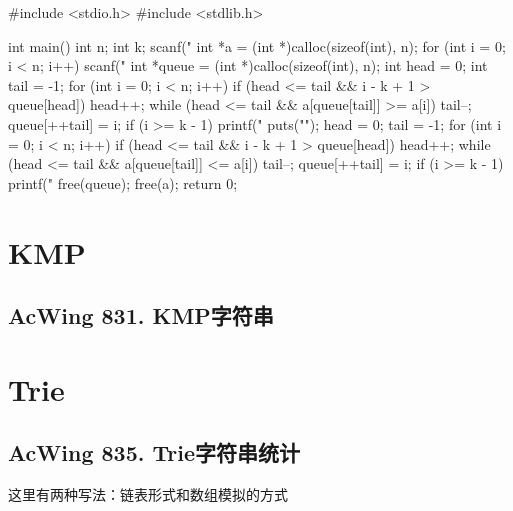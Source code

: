 \begin{mycpptwocol}
#include <stdio.h>
#include <stdlib.h>

int main()
{
    int n;
    int k;
    scanf("%
    int *a = (int *)calloc(sizeof(int), n);
    for (int i = 0; i < n; i++) {
        scanf("%
    }
    int *queue = (int *)calloc(sizeof(int), n);
    int head = 0;
    int tail = -1;
    for (int i = 0; i < n; i++) {
        if (head <= tail && i - k + 1 > queue[head]) {
            head++;
        }
        while (head <= tail && a[queue[tail]] >= a[i]) {
            tail--;
        }
        queue[++tail] = i;
        if (i >= k - 1) {
            printf("%
        }
    }
    puts("");
    head = 0;
    tail = -1;
    for (int i = 0; i < n; i++) {
        if (head <= tail && i - k + 1 > queue[head]) {
            head++;
        }
        while (head <= tail && a[queue[tail]] <= a[i]) {
            tail--;
        }
        queue[++tail] = i;
        if (i >= k - 1) {
            printf("%
        }
    }
    free(queue);
    free(a);
    return 0;
}
\end{mycpptwocol}
\section{KMP}
\subsection{AcWing 831. KMP字符串}

\section{Trie}
\subsection{AcWing 835. Trie字符串统计}

这里有两种写法：链表形式和数组模拟的方式

